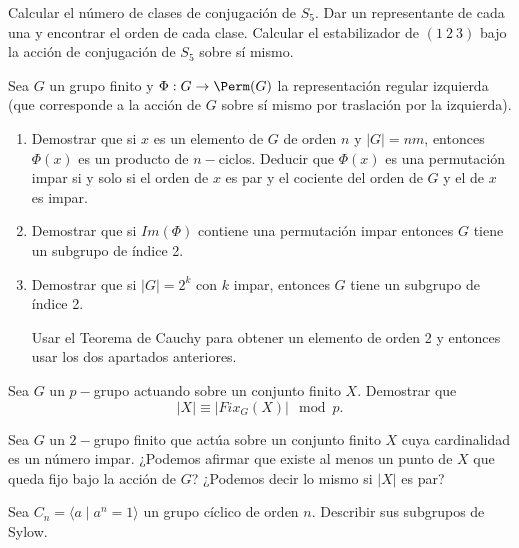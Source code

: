 \begin{ejercicio}\label{ej:6.10}
    Calcular el número de clases de conjugación de $S_5$. Dar un representante de cada una y encontrar el orden de cada clase. Calcular el estabilizador de $(1\ 2\ 3)$ bajo la acción de conjugación de $S_5$ sobre sí mismo.
\end{ejercicio}

\begin{ejercicio}
    Sea $G$ un grupo finito y $\Phi: G \to \Perm(G)$ la representación regular izquierda (que corresponde a la acción de $G$ sobre sí mismo por traslación por la izquierda).
    \begin{enumerate}
        \item Demostrar que si $x$ es un elemento de $G$ de orden $n$ y $|G| = nm$, entonces $\Phi(x)$ es un producto de $n-$ciclos. Deducir que $\Phi(x)$ es una permutación impar si y solo si el orden de $x$ es par y el cociente del orden de $G$ y el de $x$ es impar.
        \item Demostrar que si $Im(\Phi)$ contiene una permutación impar entonces $G$ tiene un subgrupo de índice 2.
        \item Demostrar que si $|G| = 2^k$ con $k$ impar, entonces $G$ tiene un subgrupo de índice 2.
        \begin{observacion}
            Usar el Teorema de Cauchy para obtener un elemento de orden 2 y entonces usar los dos apartados anteriores.
        \end{observacion}
    \end{enumerate}
\end{ejercicio}

\begin{ejercicio}\label{ej:6.12}
    Sea $G$ un $p-$grupo actuando sobre un conjunto finito $X$. Demostrar que
    \[
        |X| \equiv |{Fix}_G(X)| \mod p.
    \]
\end{ejercicio}

\begin{ejercicio}
    Sea $G$ un $2-$grupo finito que actúa sobre un conjunto finito $X$ cuya cardinalidad es un número impar. ¿Podemos afirmar que existe al menos un punto de $X$ que queda fijo bajo la acción de $G$? ¿Podemos decir lo mismo si $|X|$ es par?
\end{ejercicio}

\begin{ejercicio}\label{ej:6.14}
    Sea $C_n = \langle a \mid a^n = 1 \rangle$ un grupo cíclico de orden $n$. Describir sus subgrupos de Sylow.
\end{ejercicio}

